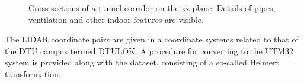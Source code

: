 \begin{figure}
    \centering
    \caption{Cross-sections of a tunnel corridor on the xz-plane. Details of pipes, ventilation and other indoor features are visible.}\label{fig:tunnel_cross_section}
    \vspace{2em}
\end{figure}

The LIDAR coordinate pairs are given in a coordinate systems related to that of the DTU campus termed DTULOK. A procedure for converting to the UTM32 system is provided along with the dataset, consisting of a so-called Helmert transformation. 


